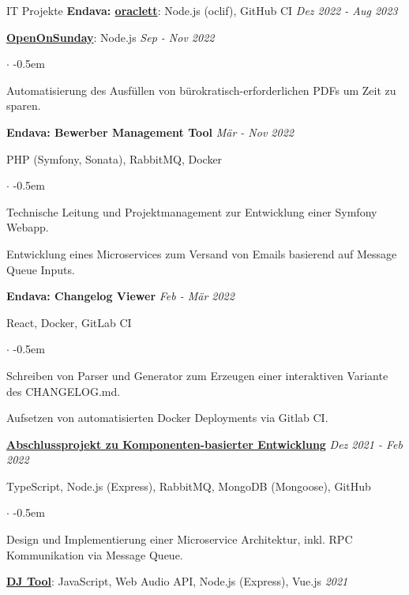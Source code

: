 \documentclass{cv}
\begin{document}
\begin{rSection}{IT Projekte}
  \textbf{Endava: \href{https://github.com/jneidel/oraclett}{oraclett}}: Node.js (oclif), GitHub CI
  \hfill
  {\em Dez 2022 - Aug 2023}

  \textbf{\href{https://openonsunday.com}{OpenOnSunday}}: Node.js
  \hfill
  {\em Sep - Nov 2022}
  \begin{list}{$\cdot$}{}
  \itemsep -0.5em \vspace{-0.5em}
    \smallskip
  \item Automatisierung des Ausfüllen von bürokratisch-erforderlichen PDFs um Zeit zu sparen.
  \end{list}

  \textbf{Endava: Bewerber Management Tool}
  \hfill
  {\em Mär - Nov 2022}

  PHP (Symfony, Sonata), RabbitMQ, Docker
  \begin{list}{$\cdot$}{}
  \itemsep -0.5em \vspace{-0.5em}
    \smallskip
  \item Technische Leitung und Projektmanagement zur Entwicklung einer Symfony Webapp.
  \item Entwicklung eines Microservices zum Versand von Emails basierend auf Message Queue Inputs.
  \end{list}

  \textbf{Endava: Changelog Viewer}
  \hfill
  {\em Feb - Mär 2022}

  React, Docker, GitLab CI
  \begin{list}{$\cdot$}{}
  \itemsep -0.5em \vspace{-0.5em}
    \smallskip
  \item Schreiben von Parser und Generator zum Erzeugen einer interaktiven Variante des CHANGELOG.md.
  \item Aufsetzen von automatisierten Docker Deployments via Gitlab CI.
  \end{list}

\textbf{\href{https://github.com/htw-kbe-jneidel/main}{Abschlussprojekt zu Komponenten-basierter Entwicklung}}
  \hfill
  {\em Dez 2021 - Feb 2022}

  TypeScript, Node.js (Express), RabbitMQ, MongoDB (Mongoose), GitHub
  \begin{list}{$\cdot$}{}
  \itemsep -0.5em \vspace{-0.5em}
    \smallskip
  \item Design und Implementierung einer Microservice Architektur, inkl. RPC Kommunikation via Message Queue.
  \end{list}
  \textbf{\href{https://github.com/vyvytn/avt}{DJ Tool}}: JavaScript, Web Audio API, Node.js (Express), Vue.js
  \hfill
  {\em 2021}
  


\end{rSection}
\end{document}
